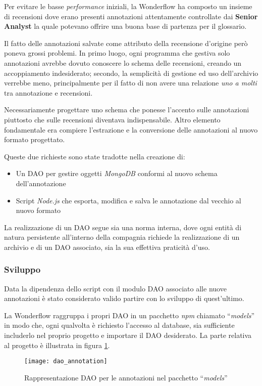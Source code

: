 Per evitare le basse \textit{performance} iniziali, la Wonderflow ha composto
un insieme di recensioni dove erano presenti annotazioni attentamente
controllate dai \textbf{Senior Analyst} la quale potevano offrire una buona base
di partenza per il glossario.

Il fatto delle annotazioni salvate come attributo della recensione d'origine
però poneva grossi problemi. In primo luogo, ogni programma che gestiva solo
annotazioni avrebbe dovuto conoscere lo schema delle recensioni, creando un
accoppiamento indesiderato; secondo, la semplicità di gestione ed uso
dell'archivio verrebbe meno, principalmente per il fatto di non avere una
relazione \textit{uno a molti} tra annotazione e recensioni.

Necessariamente progettare uno schema che ponesse l'accento sulle annotazioni
piuttosto che sulle recensioni diventava indispensabile. Altro elemento
fondamentale era compiere l'estrazione e la conversione delle annotazioni al
nuovo formato progettato.

Queste due richieste sono state tradotte nella creazione di:
\begin{itemize}
\item Un \gls{DAO} per gestire oggetti \textit{MongoDB} conformi al nuovo schema
dell'annotazione
\item Script \textit{Node.js} che esporta, modifica e salva le annotazione dal
vecchio al nuovo formato
\end{itemize}

La realizzazione di un \gls{DAO} segue sia una norma interna, dove ogni
entità di natura persistente all'interno della compagnia richiede la
realizzazione di un archivio e di un \gls{DAO} associato, sia la sua effettiva
praticità d'uso.

\subsubsection{Sviluppo}
Data la dipendenza dello script con il modulo \gls{DAO} associato alle nuove
annotazioni è stato considerato valido partire con lo sviluppo di quest'ultimo.

La Wonderflow raggruppa i propri \gls{DAO} in un pacchetto \textit{npm} chiamato
``\textit{models}'' in modo che, ogni qualvolta è richiesto l'accesso al
database, sia sufficiente includerlo nel proprio progetto e importare il
\gls{DAO} desiderato. La parte relativa al progetto è illustrata in figura
\ref{fig:dao_annotation}.

\begin{figure}[H]
\begin{center}
\texttt{[image: dao\_annotation]}
\caption{
Rappresentazione DAO per le annotazioni nel pacchetto ``\textit{models}''
}
\label{fig:dao_annotation}
\end{center}
\end{figure}

